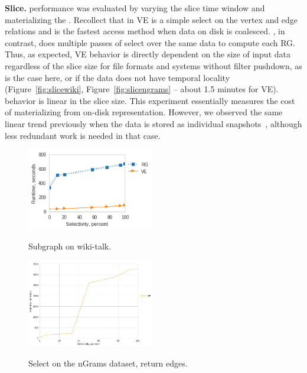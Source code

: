 {\bf Slice.}   performance was evaluated by varying the
slice time window and materializing the \tg.  Recollect that in VE
 is a simple select on the vertex and edge relations and
is the fastest access method when data on disk is coalesced.  \sg, in
contrast, does multiple passes of select over the same data to compute
each RG.  Thus, as expected, VE behavior is directly dependent on the
size of input data regardless of the slice size for file formats and
systems without filter pushdown, as is the case here, or if the data
does not have temporal locality (Figure~\ref{fig:slicewiki},
Figure~\ref{fig:slicengrams} -- about 1.5 minutes for VE).  \sg
behavior is linear in the slice size.  This experiment essentially
measures the cost of materializing \sg from \ve on-disk
representation.  However, we observed the same linear trend previously
when the data is stored as individual
snapshots~\cite{PortalarXiv2016}, although less redundant work is
needed in that case.

\begin{figure}[th]
\centering
\begin{minipage}{2.2in}
\centering
\includegraphics[width=2.2in]{figs/subgraph_wikitalk_build13.png}
\caption{Subgraph on wiki-talk.}
\vspace{-0.1in}
\label{fig:subgraphwiki}
\vspace{-0.1in}
\end{minipage}
\begin{minipage}{2.2in}
\centering
\includegraphics[width=2.2in]{figs/select_ngrams_edges_build12.png}
\vspace{-0.1in}
\caption{Select on the nGrams dataset, return edges.}
\vspace{-0.1in}
\label{fig:subgraphngrams}
\end{minipage}
\end{figure}

